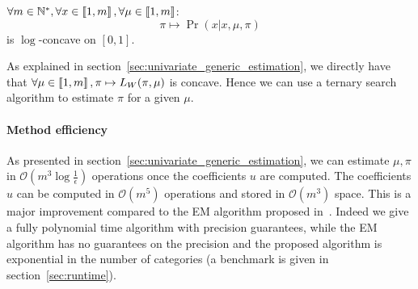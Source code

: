\begin{thm}
    $\forall m \in \mathbb{N}^*, \forall x \in \left\llbracket1, m\right\rrbracket, \forall \mu \in \left\llbracket1, m\right\rrbracket$:
    \[\pi \mapsto \Pr(x | x, \mu, \pi) \] 
    is $\log$-concave on $[0, 1]$.
\end{thm}

As explained in section~\ref{sec:univariate_generic_estimation}, we directly have that $\forall \mu \in \left\llbracket1, m\right\rrbracket, \pi \mapsto L_W(\pi, \mu)$ is concave. Hence we can use a ternary search algorithm to estimate $\pi$ for a given $\mu$.

\paragraph{Method efficiency}

As presented in section~\ref{sec:univariate_generic_estimation}, we can estimate $\mu, \pi$ in $\mathcal O(m^3 \log \frac{1}{\epsilon})$ operations once the coefficients $u$ are computed. The coefficients $u$ can be computed in $\mathcal O(m^5)$ operations and stored in $\mathcal O(m^3)$ space. This is a major improvement compared to the EM algorithm proposed in~\cite{biernacki2016model}. Indeed we give a fully polynomial time algorithm with precision guarantees, while the EM algorithm has no guarantees on the precision and the proposed algorithm is exponential in the number of categories (a benchmark is given in section~\ref{sec:runtime}).




